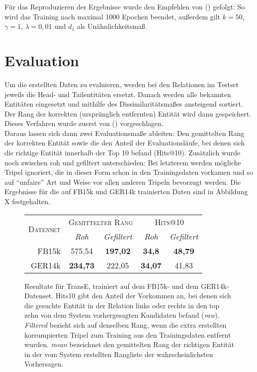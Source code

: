 Für das Reproduzieren der Ergebnisse wurde den Empfehlen von (\cite{bordes2013translating}) gefolgt: So wird das Training
nach maximal 1000 Epochen beendet, außerdem gilt $k = 50$, $\gamma = 1$, $\lambda = 0,01$ und $d_1$ als Unähnlichkeitsmaß.

\section{Evaluation}

Um die erstellten Daten zu evaluieren, werden bei den Relationen im Testset jeweils die Head- und Tailentitäten ersetzt.
Danach werden alle bekannten Entitäten eingesetzt und mithilfe des Dissimilaritätsmaßes ansteigend sortiert. Der Rang
der korrekten (ursprünglich entfernten) Entität wird dann gespeichert. Dieses Verfahren wurde zuerst von (\cite{bordes2011learning})
vorgeschlagen.\\
Daraus lassen sich dann zwei Evaluationsmaße ableiten: Den gemittelten Rang der korrekten Entität sowie die den Anteil
der Evaluationsläufe, bei denen sich die richtige Entität innerhalb der Top 10 befand (Hits@10). Zusätzlich wurde noch
zwischen roh und gefiltert unterschieden: Bei letzterem werden mögliche Tripel ignoriert, die in dieser Form schon in
den Trainingsdaten vorkamen und so auf ``unfaire'' Art und Weise vor allen anderen Tripeln bevorzugt werden.
Die Ergebnisse für die auf FB15k und GER14k trainierten Daten sind in Abbildung X festgehalten.


\begin{figure}[h]
  \centering
  \begin{tabular}{r||cc|cc}
    \multirow{2}{*}{\textsc{Datenset}} & \multicolumn{2}{c|}{\textsc{Gemittelter Rang}} & \multicolumn{2}{c}{\textsc{Hits@10}} \\
     & \emph{Roh} & \emph{Gefiltert} & \emph{Roh} & \emph{Gefiltert} \\
     \hline
     FB15k & 575,54 & \textbf{197,02} & \textbf{34,8} & \textbf{48,79} \\
     GER14k & \textbf{234,73} & 222,05 & \textbf{34,07} & 41,83 \\

  \end{tabular}
  \caption[Resultate für TransE mit FB15k und GER14k]{Resultate für TransE, trainiert auf dem FB15k- und dem GER14k-Datenset.
  Hits\@10 gibt den Anteil der Vorkommen an, bei denen sich die gesuchte Entität in der Relation links oder rechts in den top zehn
  von dem System vorhergesagten Kandidaten befand (\emph{raw}). \emph{Filtered} bezieht sich auf denselben Rang, wenn die extra erstellten
  korrumpierten Tripel zum Training aus den Trainingsdaten entfernt wurden. \emph{mean} bezeichnet den gemittelten Rang der richtigen
  Entität in der vom System erstellten Rangliste der wahrscheinlichsten Vorhersagen.}
\end{figure}

